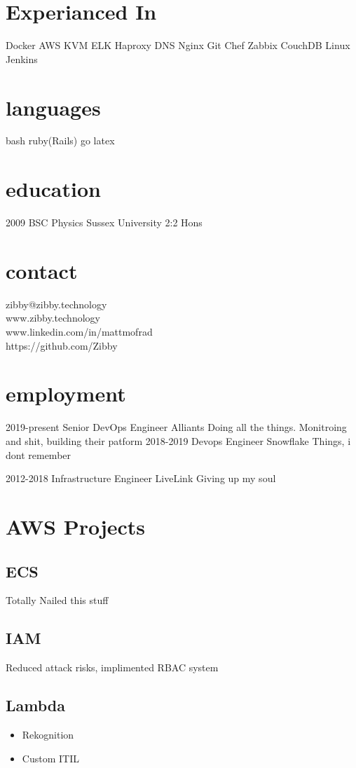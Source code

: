 \documentclass[]{friggeri-cv-a4}
\begin{document}

\begin{aside}
	\section{Experianced In}
    Docker
    AWS
    KVM
    ELK
    Haproxy
    DNS
    Nginx
    Git
    Chef
    Zabbix
    CouchDB
		Linux
		Jenkins
  \section{languages}
    bash
		ruby(Rails)
    go
    latex
  \section{education}
    2009 BSC Physics Sussex University 2:2 Hons
\end{aside}

\section{contact}
\faEnvelope\hspace{10pt}zibby@zibby.technology\\
\faGithub\hspace{10pt}www.zibby.technology \\
\faLinkedinSquare\hspace{10pt}www.linkedin.com/in/mattmofrad\\
\faGithub\hspace{10pt}https://github.com/Zibby\\

\section{employment}
 \begin{entrylist}
  \entry
  	{2019-present}
  	{Senior DevOps Engineer}
  	{Alliants}
  	{Doing all the things. Monitroing and shit, building their patform}
  \entry 
  	{2018-2019}
  	{Devops Engineer}
  	{Snowflake}
  	{Things, i dont remember}
  
  \entry
  	{2012-2018}
  	{Infrastructure Engineer}
  	{LiveLink}
  	{Giving up my soul}
 \end{entrylist}

\section{AWS Projects}
\subsection{ECS}
Totally Nailed this stuff
\subsection{IAM}
Reduced attack risks, implimented RBAC system
\subsection{Lambda}
\begin{itemize}
 			\item Rekognition
 			\item Custom ITIL
\end{itemize}
\end{document}
